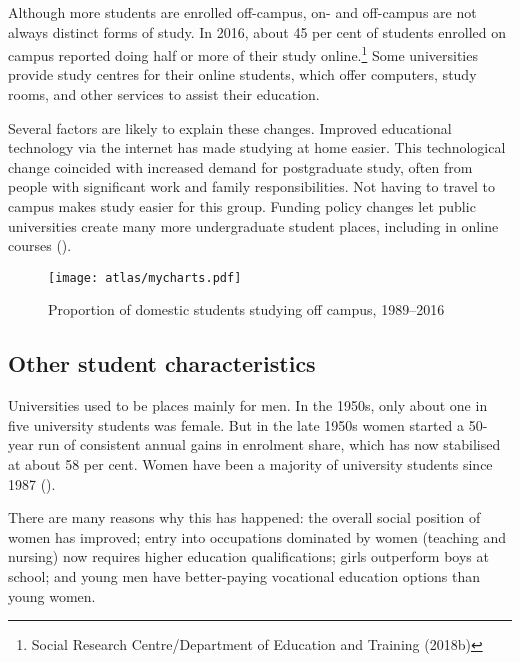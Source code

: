 \documentclass{grattan}
\begin{document}
Although more students are enrolled off-campus, on- and off-campus are not always distinct forms of study. In 2016, about 45 per cent of students enrolled on campus reported doing half or more of their study online.\footnote{Social Research Centre/Department of Education and Training (2018b)} Some universities provide study centres for their online students, which offer computers, study rooms, and other services to assist their education.

Several factors are likely to explain these changes. Improved educational technology via the internet has made studying at home easier. This technological change coincided with increased demand for postgraduate study, often from people with significant work and family responsibilities. Not having to travel to campus makes study easier for this group. Funding policy changes let public universities create many more undergraduate student places, including in online courses ().

    \begin{figure} %
    \caption{Proportion of domestic students studying off campus, 1989--2016}\label{fig:proportion-of-domestic-students-studying-off-campus-19892016}
    \texttt{[image: atlas/mycharts.pdf]}
    \end{figure}


%
\subsection{Other student characteristics }\label{subsec:other-student-characteristics}

Universities used to be places mainly for men. In the 1950s, only about one in five university students was female. But in the late 1950s women started a 50-year run of consistent annual gains in enrolment share, which has now stabilised at about 58 per cent. Women have been a majority of university students since 1987 ().

There are many reasons why this has happened: the overall social position of women has improved; entry into occupations dominated by women (teaching and nursing) now requires higher education qualifications; girls outperform boys at school; and young men have better-paying vocational education options than young women.
\end{document}
